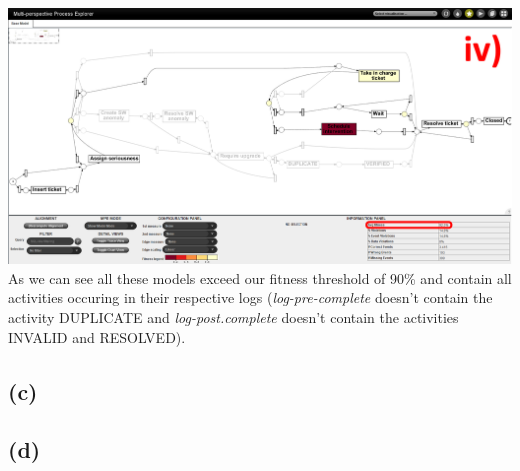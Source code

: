 \documentclass[../../main.tex]{subfiles}
\begin{document}
\includegraphics[width=0.5\columnwidth]{img/ProM_b_1iv.png}
As we can see all these models exceed our fitness threshold of 90\% and contain all activities occuring in their respective logs (\textit{log-pre-complete} doesn't contain the activity DUPLICATE and \textit{log-post.complete} doesn't contain the activities INVALID and RESOLVED).

\subsection*{(c)}


\subsection*{(d)}
\end{document}
